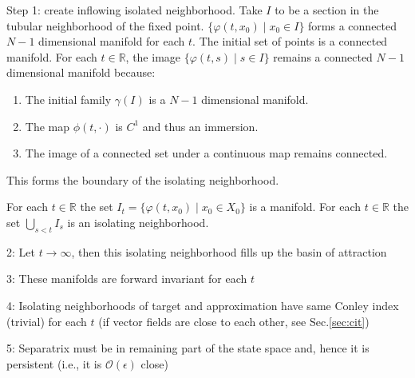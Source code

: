 \documentclass{article}
\theoremstyle{definition}
\theoremstyle{remark}
\newcommand{\reals}{\mathbb{R}}
\newcounter{ct}
\begin{document}
Step 1: create inflowing isolated neighborhood.
Take $I$ to be a section in the tubular neighborhood of the fixed point.
 $\{\varphi(t,x_0) \mid x_0\in I\}$ forms a connected $N-1$ dimensional manifold for each $t$.
The initial set of points is a connected manifold.
For each \( t \in \reals \), the image \( \{ \varphi(t, s) \mid s \in I \} \) remains a connected $N-1$ dimensional manifold because:

\begin{enumerate}
    \item The initial family \( \gamma(I) \) is a $N-1$ dimensional manifold.
    \item The map \( \phi(t, \cdot) \) is \( C^1 \) and thus an immersion.
    \item The image of a connected set under a continuous map remains connected.
\end{enumerate}
This forms the boundary of the isolating neighborhood.



For each $t\in\reals$ the set $I_t = \{\varphi(t,x_0) \mid x_0 \in X_0 \}$ is a manifold.
%
For each $t\in\reals$ the set $\bigcup_{s<t}I_s$ is an isolating neighborhood.


2: Let $t\rightarrow\infty$, then this isolating neighborhood fills up the basin of attraction

3: These manifolds are forward invariant for each $t$

4: Isolating neighborhoods of target and approximation have same Conley index (trivial) for each $t$ (if vector fields are close to each other, see Sec.\ref{sec:cit})

5: Separatrix must be in remaining part of the state space and, hence it is persistent (i.e., it is $\mathcal{O}(\epsilon)$ close)


%
\end{document}
